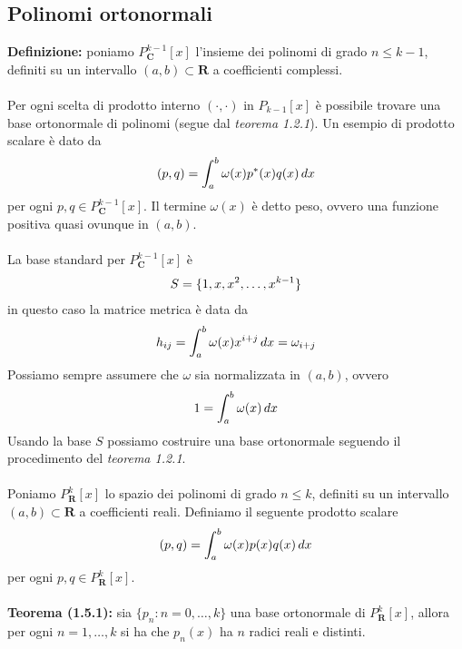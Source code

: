 \documentclass{article}
\begin{document}
\subsection{Polinomi ortonormali}
\textbf{Definizione:} poniamo $P^{k-1}_\mathbf{C}[x]$ l'insieme dei polinomi di grado $n \leq k-1$, definiti su un intervallo $(a, b) \subset \mathbf{R}$ a coefficienti complessi. \\ \\
Per ogni scelta di prodotto interno $(\cdot, \cdot)$ in $P_{k-1}[x]$ è possibile trovare una base ortonormale di polinomi (segue dal \textit{teorema 1.2.1}). Un esempio di prodotto scalare è dato da
\begin{gather}
    (p, q) = \int_a^b \omega(x)p^*(x)q(x) \, dx \notag
\end{gather}
per ogni $p, q \in P^{k-1}_\mathbf{C}[x]$. Il termine $\omega(x)$ è detto peso, ovvero una funzione positiva quasi ovunque in $(a, b)$. \\ \\
La base standard per $P^{k-1}_\mathbf{C}[x]$ è
\begin{gather}
    S = \{1, x, x^2, \dots, x^{k-1}\} \notag
\end{gather}
in questo caso la matrice metrica è data da
\begin{gather}
    h_{ij} = \int_a^b \omega(x)x^{i + j} \, dx = \omega_{i + j} \notag
\end{gather}
Possiamo sempre assumere che $\omega$ sia normalizzata in $(a, b)$, ovvero
\begin{gather}
    1 = \int_a^b \omega(x) \, dx \notag
\end{gather}
Usando la base $S$ possiamo costruire una base ortonormale seguendo il procedimento del \textit{teorema 1.2.1}. \\ \\
Poniamo $P^k_\mathbf{R}[x]$ lo spazio dei polinomi di grado $n \leq k$, definiti su un intervallo $(a, b) \subset \mathbf{R}$ a coefficienti reali. Definiamo il seguente prodotto scalare
\begin{gather}
    (p, q) = \int_a^b \omega(x)p(x)q(x) \, dx \notag
\end{gather}
per ogni $p, q \in P^k_\mathbf{R}[x]$. \\ \\
\textbf{Teorema (1.5.1):} sia $\{p_n : n = 0, \dots, k\}$ una base ortonormale di $P^k_\mathbf{R}[x]$, allora per ogni $n = 1, \dots, k$ si ha che $p_n(x)$ ha $n$ radici reali e distinti. \\
\end{document}
